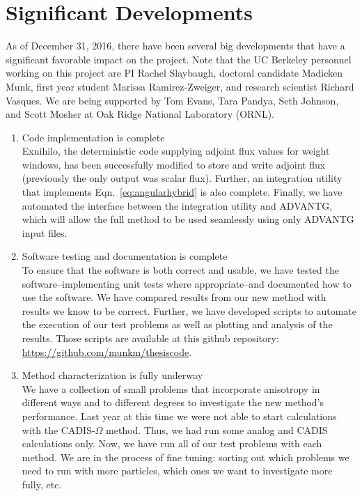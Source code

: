 \documentclass[12pt]{article}
\newcommand{\co}{CADIS-$\Omega$ }
\begin{document}
\section{Significant Developments}
\label{sect::sig-devel}

As of December 31, 2016, there have been several big developments that have a significant favorable impact on the project. 
Note that the UC Berkeley personnel working on this project are PI Rachel Slaybaugh, doctoral candidate Madicken Munk, first year student Marissa Ramirez-Zweiger, and research scientist Richard Vasques. 
We are being supported by Tom Evans, Tara Pandya, Seth Johnson, and Scott Mosher at Oak Ridge National Laboratory (ORNL). 
\begin{enumerate}
\item Code implementation is complete\\
Exnihilo, the deterministic code supplying adjoint flux values for weight windows, has been successfully modified to store and write adjoint flux (previously the only output was scalar flux). 
Further, an integration utility that implements Eqn.~\eqref{eq:angularhybrid} is also complete. 
Finally, we have automated the interface between the integration utility and ADVANTG, which will allow the full method to be used seamlessly using only ADVANTG input files. 

\item Software testing and documentation is complete\\
To ensure that the software is both correct and usable, we have tested the software--implementing unit tests where appropriate--and documented how to use the software. 
We have compared results from our new method with results we know to be correct. 
Further, we have developed scripts to automate the execution of our test problems as well as plotting and analysis of the results. 
Those scripts are available at this github repository: \url{https://github.com/munkm/thesiscode}. 
 
\item Method characterization is fully underway \\
We have a collection of small problems that incorporate anisotropy in different ways and to different degrees to investigate the new method's performance. 
Last year at this time we were not able to start calculations with the \co method. 
Thus, we had run some analog and CADIS calculations only.
Now, we have run all of our test problems with each method. 
We are in the process of fine tuning: sorting out which problems we need to run with more particles, which ones we want to investigate more fully, etc.


\end{enumerate}
\end{document}
